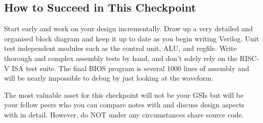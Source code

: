 \documentclass[11pt]{article}
\begin{document}





\subsection{How to Succeed in This Checkpoint}
Start early and work on your design incrementally.
Draw up a very detailed and organised block diagram and keep it up to date as you begin writing Verilog.
Unit test independent modules such as the control unit, ALU, and regfile.
Write thorough and complex assembly tests by hand, and don't solely rely on the RISC-V ISA test suite.
The final BIOS program is several 1000 lines of assembly and will be nearly impossible to debug by just looking at the waveform.

The most valuable asset for this checkpoint will not be your GSIs but will be your fellow peers who you can compare notes with and discuss design aspects with in detail.
However, do NOT under any circumstances share source code.
\end{document}
